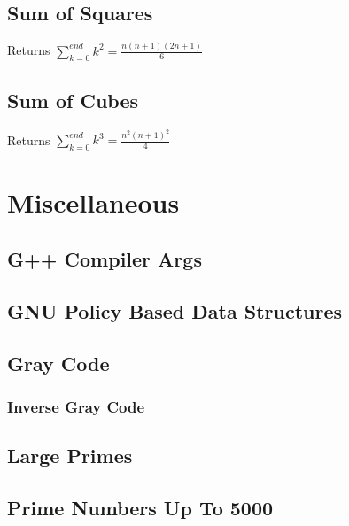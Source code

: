 \documentclass[letterpaper,11pt,twoside]{article}
\begin{document}
            \subsection{Sum of Squares}
                Returns $\sum_{k=0}^{end} k^{2} = \frac{n(n+1)(2n+1)}{6}$
                
                
            \subsection{Sum of Cubes}
                Returns $\sum_{k=0}^{end} k^{3} = \frac{n^{2}(n+1)^{2}}{4}$
                
                
        \section{Miscellaneous}
            \subsection{G++ Compiler Args}
                
            \subsection{GNU Policy Based Data Structures}
                
            \subsection{Gray Code}
                
                \subsubsection{Inverse Gray Code}
                    
            \subsection{Large Primes}
                
            \subsection{Prime Numbers Up To 5000}
                
\end{document}

